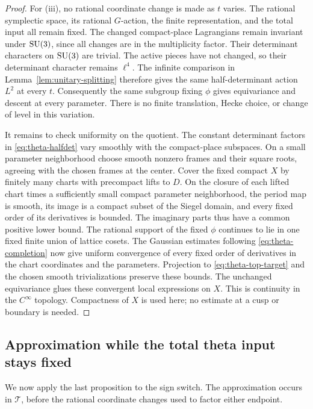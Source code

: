 \begin{proof}
For (iii), no rational coordinate change is made as \(t\)
varies.  The rational symplectic space, its rational \(G\)-action,
the finite representation, and the total input all remain
fixed.  The changed compact-place Lagrangians remain invariant
under \(\operatorname{SU}(3)\), since all changes are in the multiplicity
factor.  Their determinant characters on \(\operatorname{SU}(3)\) are
trivial.  The active pieces have not changed, so their
determinant character remains \(\ell^4\).  The infinite
comparison in Lemma~\ref{lem:unitary-splitting} therefore gives
the same half-determinant action \(L^2\) at every \(t\).
Consequently the same subgroup fixing \(\phi\) gives
equivariance and descent at every parameter.  There is no
finite translation, Hecke choice, or change of level in this
variation.

It remains to check uniformity on the quotient.  The constant
determinant factors in \eqref{eq:theta-halfdet} vary smoothly
with the compact-place subspaces.  On a small parameter
neighborhood choose smooth nonzero frames and their square
roots, agreeing with the chosen frames at the center.
Cover the fixed compact \(X\) by finitely many charts with
precompact lifts to \(D\).  On the closure of each lifted chart
times a sufficiently small compact parameter neighborhood, the
period map is smooth, its image is a compact subset of the
Siegel domain, and every fixed order of its derivatives is
bounded.  The imaginary parts thus have a common positive
lower bound.  The rational support of the fixed \(\phi\)
continues to lie in one fixed finite union of lattice cosets.
The Gaussian estimates following
\eqref{eq:theta-completion} now give uniform convergence of
every fixed order of derivatives in the chart coordinates and
the parameters.  Projection to \eqref{eq:theta-top-target}
and the chosen smooth trivializations preserve these bounds.
The unchanged equivariance glues these convergent local
expressions on \(X\).  This is continuity in the \(C^\infty\)
topology.  Compactness of \(X\) is used here; no estimate at a
cusp or boundary is needed.
\end{proof}

\subsection{Approximation while the total theta input stays fixed}\label{subsec:theta-approximation}

We now apply the last proposition to the sign switch.  The
approximation occurs in \(\mathcal T\), before the rational
coordinate changes used to factor either endpoint.

